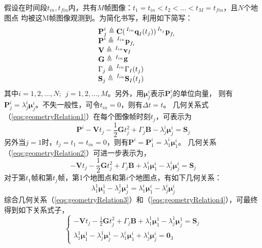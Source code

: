 \documentclass{article}
\begin{document}
\par
假设在时间段$t_{in},t_{fin}$内，共有$M$帧图像：$t_1=t_{in}<t_2<\dots<t_M=t_{fin}$，且$N$个地图点
均被这M帧图像观测到。为简化书写，利用如下简写：
\begin{equation}
    \begin{array}{ll}
        &\textbf{P}_j^i\triangleq\textbf{C}(\sideset{^{I_{in}}}{}{\mathop{\textbf{q}_{I}}}(t_j))
        \sideset{^{I_{t_j}}}{}{\mathop{\textbf{p}_{f_i}}}\\
        &\textbf{P}^i \triangleq \sideset{^{I_{in}}}{}{\mathop{\textbf{p}_{f_i}}}\\
        &\textbf{V} \triangleq \sideset{^{I_{in}}}{}{\mathop{\textbf{v}_I}}\\
        &\textbf{G} \triangleq \sideset{^{I_{in}}}{}{\mathop{\mathbf{g}}}\\
        &\Gamma_j \triangleq \sideset{^{I_{in}}}{}{\mathop{{\Gamma}_{I}(t_j)}}\\
        &\textbf{S}_j \triangleq \sideset{^{I_{in}}}{}{\mathop{\textbf{S}_{I}(t_j)}}
    \end{array}
\end{equation}
其中$i=1,2,\dots,N;\ \ j=1,2,\dots,M$。另外，用$\mathbf{\mu}_j^i$表示$\textbf{P}_j^i$的单位向量，
则有$\textbf{P}_j^i=\lambda_j^i\mathbf{\mu}_j^i$。不失一般性，可令$t_{in}=0$，则有$\Delta{t}=t$。
几何关系式（\ref{eqs:geometryRelation1}）在每个图像帧时刻$t_j$，可表示为
\begin{equation}\label{eqs:geometryRelation2}
    \textbf{P}^i-\textbf{V}t_j-\frac{1}{2}\textbf{G}t_j^2+\Gamma_j\textbf{B}
    -\lambda_j^i\mathbf{\mu}_j^i=\textbf{S}_j
\end{equation}
另外当$j=1$时，$t_j=t_1=t_{in}=0$，则有$\textbf{P}^i=\textbf{P}^i_1=\lambda_1^i\mathbf{\mu}_1^i$。
几何关系（\ref{eqs:geometryRelation2}）可进一步表示为，
\begin{equation}\label{eqs:geometryRelation3}
    -\textbf{V}t_j-\frac{1}{2}\textbf{G}t_j^2+\Gamma_j\textbf{B}+\lambda_1^i\mathbf{\mu}_1^i
    -\lambda_j^i\mathbf{\mu}_j^i=\textbf{S}_j
\end{equation}
对于第$t_1$帧和第$t_j$帧，第1个地图点和第$i$个地图点，有如下几何关系：
\begin{equation}\label{eqs:geometryRelation4}
    \lambda_1^1\mathbf{\mu}_1^1-\lambda_j^1\mathbf{\mu}_j^1
    =\lambda_1^i\mathbf{\mu}_1^i-\lambda_j^i\mathbf{\mu}_j^i
\end{equation}
综合几何关系（\ref{eqs:geometryRelation3}）和（\ref{eqs:geometryRelation4}），可最终得到如下关系式子，
\begin{equation}\label{eqs:geometryRelation5}
    \left\{\begin{array}{c}
        -\textbf{V}t_j-\frac{1}{2}\textbf{G}t_j^2+\Gamma_j\textbf{B}+\lambda_1^1\mathbf{\mu}_1^1
        -\lambda_j^1\mathbf{\mu}_j^1=\textbf{S}_j\\
        \lambda_1^1\mathbf{\mu}_1^1-\lambda_j^1\mathbf{\mu}_j^1
        -\lambda_1^i\mathbf{\mu}_1^i+\lambda_j^i\mathbf{\mu}_j^i=\textbf{0}_3
    \end{array}\right.
\end{equation}
\end{document}
